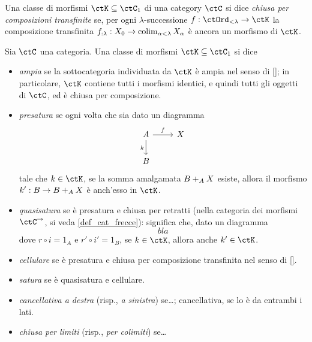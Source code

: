   \begin{definition}
    Una classe di morfismi $\ctK\subseteq\ctC_1$ di una category $\ctC$ si dice \emph{chiusa per composizioni transfinite} se, per ogni $\lambda$-successione $f : \ctOrd_{<\lambda}\to\ctK$ la composizione transfinita $f_{:\lambda} : X_0\to \colim_{\alpha < \lambda} X_\alpha$ è ancora un morfismo di $\ctK$.
  \end{definition}
\begin{definition}
  Sia $\ctC$ una categoria. Una classe di morfismi $\ctK\subseteq\ctC_1$ si dice 
  \begin{itemize}
    \item \emph{ampia} se la sottocategoria individuata da $\ctK$ è ampia nel senso di \ref{}; in particolare, $\ctK$ contiene tutti i morfismi identici, e quindi tutti gli oggetti di $\ctC$, ed è chiusa per composizione.
    \item \emph{presatura} se ogni volta che sia dato un diagramma 
      \[
        \begin{tikzcd}
          A \ar[d, "k"']\ar[r, "f"]& X \\ 
          B & 
        \end{tikzcd}
      \]
      tale che $k\in\ctK$, se la somma amalgamata $\push BXA$ esiste, allora il morfismo $k' : B\to \push BXA$ è anch'esso in $\ctK$.
    \item \emph{quasisatura} se è presatura e chiusa per retratti (nella categoria dei morfismi $\ctC^\to$, si veda \ref{def_cat_frecce}): significa che, dato un diagramma 
      \[bla\]
      dove $r\circ i = 1_A$ e $r'\circ i' = 1_B$, se $k\in \ctK$, allora anche $k'\in\ctK$.
    \item \emph{cellulare} se è presatura e chiusa per composizione transfinita nel senso di \ref{}.
    \item \emph{satura} se è quasisatura e cellulare.
    \item \emph{cancellativa a destra} (risp., \emph{a sinistra}) se\dots; cancellativa, se lo è da entrambi i lati.
    \item \emph{chiusa per limiti} (risp., \emph{per colimiti}) se\dots
  \end{itemize}
\end{definition}
\begin{examples}
\end{examples}
